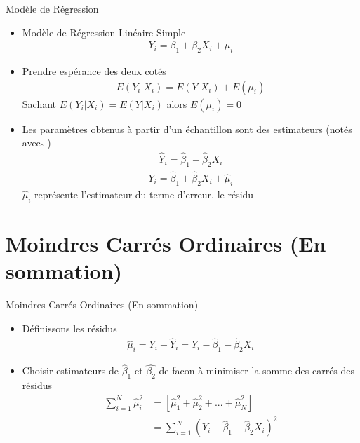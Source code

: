 \documentclass{beamer}
\begin{document}
\begin{frame}{Modèle de Régression}
\begin{itemize}
\item Modèle de Régression Linéaire Simple 
\begin{align*}
Y_i = \beta_1 + \beta_2 X_i + \mu_i 
\end{align*}
\item Prendre espérance des deux cotés 
\begin{align*}
E(Y_i \vert X_i)=E(Y \vert X_i)+E(\mu_i)
\end{align*}
Sachant $E(Y_i \vert X_i)=E(Y \vert X_i)$ alors $E(\mu_i)=0$
\item Les paramètres obtenus à partir d'un échantillon sont des estimateurs (notés avec \hspace{0.1cm} $\hat{}$ \hspace{0.1cm})
\begin{align*}
\hat{Y}_i=\hat{\beta}_1+\hat{\beta}_2 X_i
\end{align*}
\begin{align*}
Y_i = \hat{\beta}_1+\hat{\beta}_2 X_i+\hat{\mu}_i
\end{align*}
$\hat{\mu}_i$ représente l'estimateur du terme d'erreur, le résidu
\end{itemize}
\end{frame}

\section{Moindres Carrés Ordinaires (En sommation)}

\frame{\tableofcontents[current]}

\begin{frame}{Moindres Carrés Ordinaires (En sommation)}
\begin{itemize}
\item Définissons les résidus
\begin{align*}
\hat{\mu}_i = Y_i - \hat{Y}_i = Y_i - \hat{\beta}_1-\hat{\beta}_2 X_i
\end{align*}
\item Choisir estimateurs de $\hat{\beta}_1$ et $\hat{\beta_2}$ de facon à minimiser la somme des carrés des résidus 
\begin{align*}
\sum_{i=1}^{N} \hat{\mu}_i^2 & = \left[\hat{\mu}_1^2 +\hat{\mu}_2^2+...+\hat{\mu}_N^2 \right] \\ & = \sum_{i=1}^{N}(Y_i-\hat{\beta}_1-\hat{\beta}_2 X_i)^2
\end{align*}
\end{itemize}
\end{frame}
\end{document}
